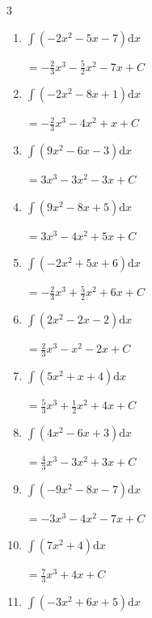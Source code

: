 \begin{multicols}{3}
\begin{enumerate}
        $\displaystyle =2x^{3}-4x^{2}+ C$

  \item $\displaystyle \int \left( -2x^{2}-5x-7 \right) \mathrm{d}x$

        $\displaystyle =-\frac{2}{3}x^{3}-\frac{5}{2}x^{2}-7x+ C$

  \item $\displaystyle \int \left( -2x^{2}-8x+1 \right) \mathrm{d}x$

        $\displaystyle =-\frac{2}{3}x^{3}-4x^{2}+x+ C$

\columnbreak %

  \item $\displaystyle \int \left( 9x^{2}-6x-3 \right) \mathrm{d}x$

        $\displaystyle =3x^{3}-3x^{2}-3x+ C$

  \item $\displaystyle \int \left( 9x^{2}-8x+5 \right) \mathrm{d}x$

        $\displaystyle =3x^{3}-4x^{2}+5x+ C$

  \item $\displaystyle \int \left( -2x^{2}+5x+6 \right) \mathrm{d}x$

        $\displaystyle =-\frac{2}{3}x^{3}+\frac{5}{2}x^{2}+6x+ C$

  \item $\displaystyle \int \left( 2x^{2}-2x-2 \right) \mathrm{d}x$

        $\displaystyle =\frac{2}{3}x^{3}-x^{2}-2x+ C$

  \item $\displaystyle \int \left( 5x^{2}+x+4 \right) \mathrm{d}x$

        $\displaystyle =\frac{5}{3}x^{3}+\frac{1}{2}x^{2}+4x+ C$

  \item $\displaystyle \int \left( 4x^{2}-6x+3 \right) \mathrm{d}x$

        $\displaystyle =\frac{4}{3}x^{3}-3x^{2}+3x+ C$

  \item $\displaystyle \int \left( -9x^{2}-8x-7 \right) \mathrm{d}x$

        $\displaystyle =-3x^{3}-4x^{2}-7x+ C$

  \item $\displaystyle \int \left( 7x^{2}+4 \right) \mathrm{d}x$

        $\displaystyle =\frac{7}{3}x^{3}+4x+ C$

  \item $\displaystyle \int \left( -3x^{2}+6x+5 \right) \mathrm{d}x$


\end{enumerate}
\end{multicols}
